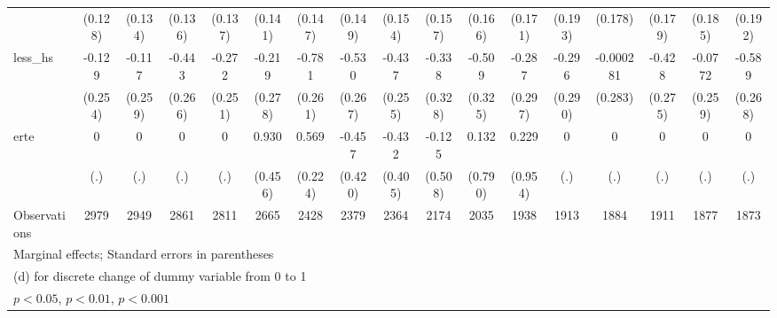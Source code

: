 {\begin{tabular}{l*{16}{c}}
                    &     (0.128)         &     (0.134)         &     (0.136)         &     (0.137)         &     (0.141)         &     (0.147)         &     (0.149)         &     (0.154)         &     (0.157)         &     (0.166)         &     (0.171)         &     (0.193)         &     (0.178)         &     (0.179)         &     (0.185)         &     (0.192)         \\
[1em]
less\_hs             &      -0.129         &      -0.117         &      -0.443         &      -0.272         &      -0.219         &      -0.781\sym{**} &      -0.530\sym{*}  &      -0.437         &      -0.338         &      -0.509         &      -0.287         &      -0.296         &   -0.000281         &      -0.428         &     -0.0772         &      -0.589\sym{*}  \\
                    &     (0.254)         &     (0.259)         &     (0.266)         &     (0.251)         &     (0.278)         &     (0.261)         &     (0.267)         &     (0.255)         &     (0.328)         &     (0.325)         &     (0.297)         &     (0.290)         &     (0.283)         &     (0.275)         &     (0.259)         &     (0.268)         \\
[1em]
erte                &           0         &           0         &           0         &           0         &       0.930\sym{*}  &       0.569\sym{*}  &      -0.457         &      -0.432         &      -0.125         &       0.132         &       0.229         &           0         &           0         &           0         &           0         &           0         \\
                    &         (.)         &         (.)         &         (.)         &         (.)         &     (0.456)         &     (0.224)         &     (0.420)         &     (0.405)         &     (0.508)         &     (0.790)         &     (0.954)         &         (.)         &         (.)         &         (.)         &         (.)         &         (.)         \\
\hline
Observations        &        2979         &        2949         &        2861         &        2811         &        2665         &        2428         &        2379         &        2364         &        2174         &        2035         &        1938         &        1913         &        1884         &        1911         &        1877         &        1873         \\
\hline\hline
\multicolumn{17}{l}{\footnotesize Marginal effects; Standard errors in parentheses}\\
\multicolumn{17}{l}{\footnotesize  (d) for discrete change of dummy variable from 0 to 1}\\
\multicolumn{17}{l}{\footnotesize \sym{*} \(p<0.05\), \sym{**} \(p<0.01\), \sym{***} \(p<0.001\)}\\
\end{tabular}
}
